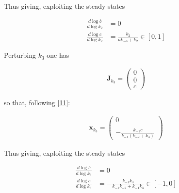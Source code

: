 \documentclass{article}
\begin{document}
	
	Thus giving, exploiting the steady states
	
	\begin{center}
		\begin{equation}
			\begin{aligned}
				\frac{d \log b}{d \log k_2} &= 0 \\
				\frac{d \log c}{d \log k_2} &= \frac{k_2 }{a k_{-3} + k_2} \in \left[0, 1 \right]
			\end{aligned}
		\end{equation}
	\end{center}
	
	Perturbing $k_3$ one has
	
	\begin{center}
		\begin{equation}
			\begin{aligned}
				\mathbf{J}_{k_3}= \begin{pmatrix}
					0\\
					0\\
					c
				\end{pmatrix}
				\label{99}
			\end{aligned}
		\end{equation}
	\end{center}
	
	so that, following \eqref{11}:
	
	\begin{center}
		\begin{equation}
			\begin{aligned}
				\mathbf{x}_{k_3}= \begin{pmatrix}
					0 \\ \\
					-\frac{k_{-1}c}{k_{-1}(k_{-2}+k_3)}
				\end{pmatrix}
				\label{100}
			\end{aligned}
		\end{equation}
	\end{center}
	
	
	Thus giving, exploiting the steady states
	
	\begin{center}
		\begin{equation}
			\begin{aligned}
				\frac{d \log b}{d \log k_3} &= 0 \\
				\frac{d \log c}{d \log k_3} &= -\frac{k_{-1} k_3 }{k_{-1}k_{-2} + k_{-1}k_3} \in \left[-1, 0 \right]
			\end{aligned}
		\end{equation}
	\end{center}
	
\end{document}
